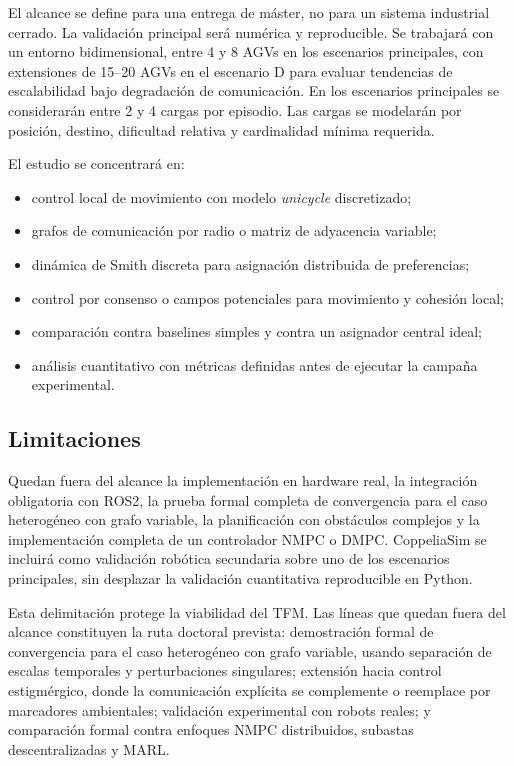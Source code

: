 \documentclass[11pt,a4paper]{article}
\begin{document}
El alcance se define para una entrega de máster, no para un sistema industrial cerrado. La validación principal será numérica y reproducible. Se trabajará con un entorno bidimensional, entre 4 y 8 AGVs en los escenarios principales, con extensiones de 15--20 AGVs en el escenario D para evaluar tendencias de escalabilidad bajo degradación de comunicación. En los escenarios principales se considerarán entre 2 y 4 cargas por episodio. Las cargas se modelarán por posición, destino, dificultad relativa y cardinalidad mínima requerida.

El estudio se concentrará en:
\begin{itemize}
  \item control local de movimiento con modelo \textit{unicycle} discretizado;
  \item grafos de comunicación por radio o matriz de adyacencia variable;
  \item dinámica de Smith discreta para asignación distribuida de preferencias;
  \item control por consenso o campos potenciales para movimiento y cohesión local;
  \item comparación contra baselines simples y contra un asignador central ideal;
  \item análisis cuantitativo con métricas definidas antes de ejecutar la campaña experimental.
\end{itemize}

\subsection{Limitaciones}

Quedan fuera del alcance la implementación en hardware real, la integración obligatoria con ROS2, la prueba formal completa de convergencia para el caso heterogéneo con grafo variable, la planificación con obstáculos complejos y la implementación completa de un controlador NMPC o DMPC. CoppeliaSim se incluirá como validación robótica secundaria sobre uno de los escenarios principales, sin desplazar la validación cuantitativa reproducible en Python.

Esta delimitación protege la viabilidad del TFM. Las líneas que quedan fuera del alcance constituyen la ruta doctoral prevista: demostración formal de convergencia para el caso heterogéneo con grafo variable, usando separación de escalas temporales y perturbaciones singulares; extensión hacia control estigmérgico, donde la comunicación explícita se complemente o reemplace por marcadores ambientales; validación experimental con robots reales; y comparación formal contra enfoques NMPC distribuidos, subastas descentralizadas y MARL.
\end{document}
